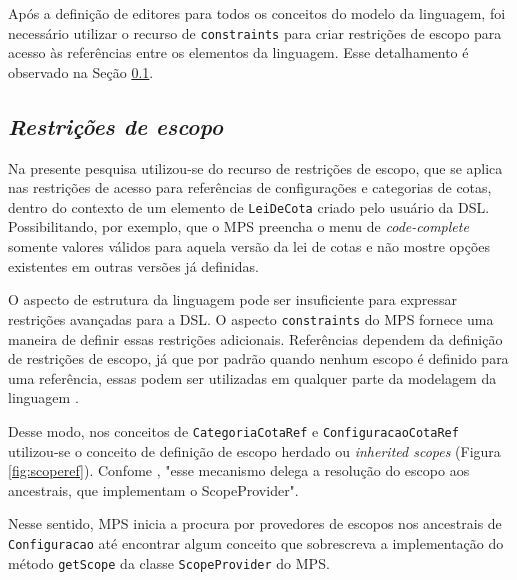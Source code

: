 



\newpage
Após a definição de editores para todos os conceitos do modelo da linguagem, foi necessário utilizar o recurso de \texttt{constraints} para criar restrições de escopo para acesso às referências entre os elementos da linguagem. Esse detalhamento é observado na Seção \ref{sub:sec:constraints}.

\newpage
\subsection{\textit{Restrições de escopo}}
\label{sub:sec:constraints}

Na presente pesquisa utilizou-se do recurso de restrições de escopo, que se aplica nas restrições de acesso para referências de configurações e categorias de cotas, dentro do contexto de um elemento de \texttt{LeiDeCota} criado pelo usuário da DSL. Possibilitando, por exemplo, que o \gls{MPS} preencha o menu de \textit{code-complete} somente valores válidos para aquela versão da lei de cotas e não mostre opções existentes em  outras versões já definidas.
 
\begin{citacao}
O aspecto de estrutura da linguagem pode ser insuficiente para expressar restrições avançadas para a DSL. O aspecto \texttt{constraints} do MPS fornece uma maneira de definir essas restrições adicionais. Referências dependem da definição de restrições de escopo, já que por padrão quando nenhum escopo é definido para uma referência, essas podem ser utilizadas em qualquer parte da modelagem da linguagem \cite[s/p, tradução nossa]{jetbrains}.
\end{citacao}

Desse modo, nos conceitos de \texttt{CategoriaCotaRef} e \texttt{ConfiguracaoCotaRef} utilizou-se o conceito de definição de escopo herdado ou \textit{inherited scopes} (Figura \ref{fig:scoperef}). Confome , "esse mecanismo delega a resolução do escopo aos ancestrais, que implementam o ScopeProvider".



\newpage

Nesse sentido, \gls{MPS} inicia a procura por provedores de escopos nos ancestrais de \texttt{Configuracao} até encontrar algum conceito que sobrescreva a implementação do método \texttt{getScope} da classe \texttt{ScopeProvider} do \gls{MPS}. 

